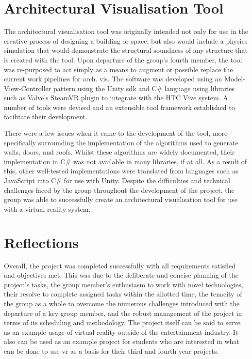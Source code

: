 \section{Architectural Visualisation Tool}

    The architectural visualisation tool was originally intended not only for use in the creative process of designing a building or space, but also would include a physics simulation that would demonstrate the structural soundness of any structure that is created with the tool. Upon departure of the group's fourth member, the tool was re-purposed to act simply as a means to augment or possible replace the current work pipelines for arch. vis. The software was developed using an Model-View-Controller pattern using the Unity \acrshort{sdk} and C\# language using libraries such as Valve's SteamVR plugin to integrate with the HTC Vive system. A number of tools were devised and an extensible tool framework established to facilitate their development.
    
    There were a few issues when it came to the development of the tool, more specifically surrounding the implementation of the algorithms used to generate walls, doors, and roofs. Whilst these algorithms are widely documented, their implementation in C\# was not available in many libraries, if at all. As a result of this, other well-tested implementations were translated from languages such as JavaScript into C\# for use with Unity. Despite the difficulties and technical challenges faced by the group throughout the development of the project, the group was able to successfully create an architectural visualisation tool for use with a virtual reality system.
    
\section{Reflections}

    Overall, the project was completed successfully with all requirements satisfied and objectives met. This was due to the deliberate and concise planning of the project's tasks, the group member's enthusiasm to work with novel technologies, their resolve to complete assigned tasks within the allotted time, the tenacity of the group as a whole to overcome the numerous challenges introduced with the departure of a key group member, and the robust management of the project in terms of its scheduling and methodology. The project itself can be said to serve as an example usage of virtual reality outside of the entertainment industry. It also can be used as an example project for students who are interested in what can be done to use \acrshort{vr} as a basis for their third and fourth year projects. 

